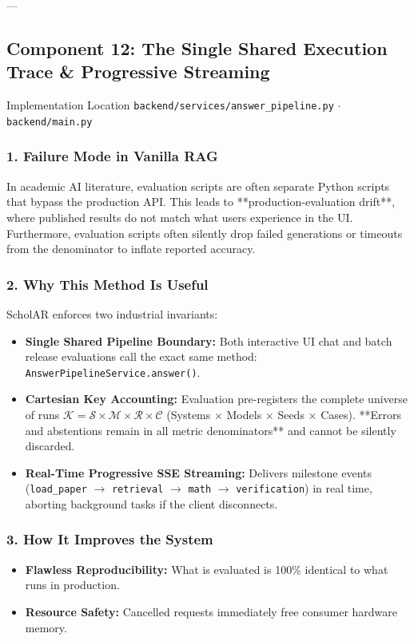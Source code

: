 \documentclass[11pt,a4paper]{article}
\begin{document}
---

\subsection{Component 12: The Single Shared Execution Trace \& Progressive Streaming}
\begin{codebox}{Implementation Location}
\texttt{backend/services/answer\_pipeline.py} $\cdot$ \texttt{backend/main.py}
\end{codebox}

\subsubsection{1. Failure Mode in Vanilla RAG}
In academic AI literature, evaluation scripts are often separate Python scripts that bypass the production API. This leads to **production-evaluation drift**, where published results do not match what users experience in the UI. Furthermore, evaluation scripts often silently drop failed generations or timeouts from the denominator to inflate reported accuracy.

\subsubsection{2. Why This Method Is Useful}
ScholAR enforces two industrial invariants:
\begin{itemize}[leftmargin=*]
    \item \textbf{Single Shared Pipeline Boundary:} Both interactive UI chat and batch release evaluations call the exact same method: \texttt{AnswerPipelineService.answer()}.
    \item \textbf{Cartesian Key Accounting:} Evaluation pre-registers the complete universe of runs $\mathcal{K} = \mathcal{S} \times \mathcal{M} \times \mathcal{R} \times \mathcal{C}$ (Systems $\times$ Models $\times$ Seeds $\times$ Cases). **Errors and abstentions remain in all metric denominators** and cannot be silently discarded.
    \item \textbf{Real-Time Progressive SSE Streaming:} Delivers milestone events (\texttt{load\_paper} $\rightarrow$ \texttt{retrieval} $\rightarrow$ \texttt{math} $\rightarrow$ \texttt{verification}) in real time, aborting background tasks if the client disconnects.
\end{itemize}

\subsubsection{3. How It Improves the System}
\begin{itemize}[leftmargin=*]
    \item \textbf{Flawless Reproducibility:} What is evaluated is 100\% identical to what runs in production.
    \item \textbf{Resource Safety:} Cancelled requests immediately free consumer hardware memory.
\end{itemize}
\end{document}

